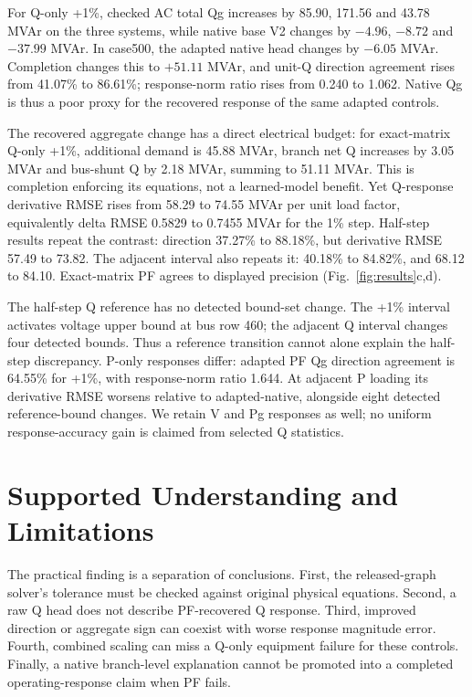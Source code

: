 \documentclass[conference,letterpaper]{IEEEtran}
\begin{document}
For Q-only +1\%, checked AC total Qg increases by 85.90, 171.56 and 43.78 MVAr on the three systems, while native base V2 changes by $-4.96$, $-8.72$ and $-37.99$ MVAr. In case500, the adapted native head changes by $-6.05$ MVAr. Completion changes this to $+51.11$ MVAr, and unit-Q direction agreement rises from 41.07\% to 86.61\%; response-norm ratio rises from 0.240 to 1.062. Native Qg is thus a poor proxy for the recovered response of the same adapted controls.

The recovered aggregate change has a direct electrical budget: for exact-matrix Q-only +1\%, additional demand is 45.88 MVAr, branch net Q increases by 3.05 MVAr and bus-shunt Q by 2.18 MVAr, summing to 51.11 MVAr. This is completion enforcing its equations, not a learned-model benefit. Yet Q-response derivative RMSE rises from 58.29 to 74.55 MVAr per unit load factor, equivalently delta RMSE 0.5829 to 0.7455 MVAr for the 1\% step. Half-step results repeat the contrast: direction 37.27\% to 88.18\%, but derivative RMSE 57.49 to 73.82. The adjacent interval also repeats it: 40.18\% to 84.82\%, and 68.12 to 84.10. Exact-matrix PF agrees to displayed precision (Fig.~\ref{fig:results}c,d).

The half-step Q reference has no detected bound-set change. The +1\% interval activates voltage upper bound at bus row 460; the adjacent Q interval changes four detected bounds. Thus a reference transition cannot alone explain the half-step discrepancy. P-only responses differ: adapted PF Qg direction agreement is 64.55\% for +1\%, with response-norm ratio 1.644. At adjacent P loading its derivative RMSE worsens relative to adapted-native, alongside eight detected reference-bound changes. We retain V and Pg responses as well; no uniform response-accuracy gain is claimed from selected Q statistics.

\section{Supported Understanding and Limitations}
The practical finding is a separation of conclusions. First, the released-graph solver's tolerance must be checked against original physical equations. Second, a raw Q head does not describe PF-recovered Q response. Third, improved direction or aggregate sign can coexist with worse response magnitude error. Fourth, combined scaling can miss a Q-only equipment failure for these controls. Finally, a native branch-level explanation cannot be promoted into a completed operating-response claim when PF fails.
\end{document}
